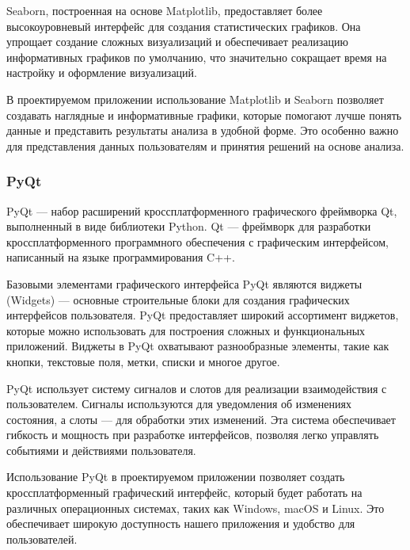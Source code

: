 Seaborn, построенная на основе Matplotlib, предоставляет более высокоуровневый интерфейс для создания статистических графиков. Она упрощает создание сложных визуализаций и обеспечивает реализацию информативных графиков по умолчанию, что значительно сокращает время на настройку и оформление визуализаций.

В проектируемом приложении использование Matplotlib и Seaborn позволяет создавать наглядные и информативные графики, которые помогают лучше понять данные и представить результаты анализа в удобной форме. Это особенно важно для представления данных пользователям и принятия решений на основе анализа.


\subsubsection{PyQt}

PyQt --- набор расширений кроссплатформенного графического фреймворка Qt, выполненный в виде библиотеки Python. Qt — фреймворк для разработки кроссплатформенного программного обеспечения с графическим интерфейсом, написанный на языке программирования C++.

Базовыми элементами графического интерфейса PyQt являются виджеты (Widgets) — основные строительные блоки для создания графических интерфейсов пользователя. PyQt предоставляет широкий ассортимент виджетов, которые можно использовать для построения сложных и функциональных приложений. Виджеты в PyQt охватывают разнообразные элементы, такие как кнопки, текстовые поля, метки, списки и многое другое. 

PyQt использует систему сигналов и слотов для реализации взаимодействия с пользователем. Сигналы используются для уведомления об изменениях состояния, а слоты — для обработки этих изменений. Эта система обеспечивает гибкость и мощность при разработке интерфейсов, позволяя легко управлять событиями и действиями пользователя.

Использование PyQt в проектируемом приложении позволяет создать кроссплатформенный графический интерфейс, который будет работать на различных операционных системах, таких как Windows, macOS и Linux. Это обеспечивает широкую доступность нашего приложения и удобство для пользователей.

